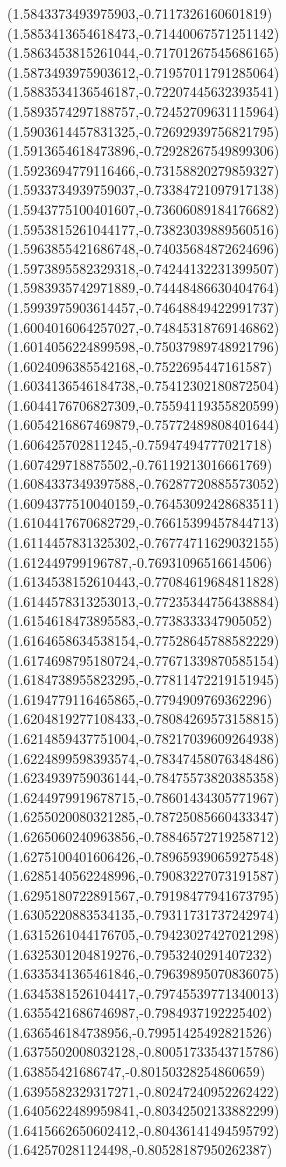 \documentclass[12pt]{article}
\theoremstyle{plain}
\theoremstyle{definition}
\theoremstyle{remark}
\begin{document}
\begin{figure}
{  (1.5843373493975903,-0.7117326160601819)%
  (1.5853413654618473,-0.71440067571251142)%
  (1.5863453815261044,-0.71701267545686165)%
  (1.5873493975903612,-0.71957011791285064)%
  (1.5883534136546187,-0.72207445632393541)%
  (1.5893574297188757,-0.72452709631115964)%
  (1.5903614457831325,-0.72692939756821795)%
  (1.5913654618473896,-0.72928267549899306)%
  (1.5923694779116466,-0.73158820279859327)%
  (1.5933734939759037,-0.73384721097917138)%
  (1.5943775100401607,-0.73606089184176682)%
  (1.5953815261044177,-0.73823039889560516)%
  (1.5963855421686748,-0.74035684872624696)%
  (1.5973895582329318,-0.74244132231399507)%
  (1.5983935742971889,-0.74448486630404764)%
  (1.5993975903614457,-0.74648849422991737)%
  (1.6004016064257027,-0.74845318769146862)%
  (1.6014056224899598,-0.75037989748921796)%
  (1.6024096385542168,-0.7522695447161587)%
  (1.6034136546184738,-0.75412302180872504)%
  (1.6044176706827309,-0.75594119355820599)%
  (1.6054216867469879,-0.75772489808401644)%
  (1.606425702811245,-0.75947494777021718)%
  (1.607429718875502,-0.76119213016661769)%
  (1.6084337349397588,-0.76287720885573052)%
  (1.6094377510040159,-0.76453092428683511)%
  (1.6104417670682729,-0.76615399457844713)%
  (1.6114457831325302,-0.76774711629032155)%
  (1.612449799196787,-0.76931096516614506)%
  (1.6134538152610443,-0.77084619684811828)%
  (1.6144578313253013,-0.77235344756438884)%
  (1.6154618473895583,-0.7738333347905052)%
  (1.6164658634538154,-0.77528645788582229)%
  (1.6174698795180724,-0.77671339870585154)%
  (1.6184738955823295,-0.77811472219151945)%
  (1.6194779116465865,-0.7794909769362296)%
  (1.6204819277108433,-0.78084269573158815)%
  (1.6214859437751004,-0.78217039609264938)%
  (1.6224899598393574,-0.78347458076348486)%
  (1.6234939759036144,-0.78475573820385358)%
  (1.6244979919678715,-0.78601434305771967)%
  (1.6255020080321285,-0.78725085660433347)%
  (1.6265060240963856,-0.78846572719258712)%
  (1.6275100401606426,-0.78965939065927548)%
  (1.6285140562248996,-0.79083227073191587)%
  (1.6295180722891567,-0.79198477941673795)%
  (1.6305220883534135,-0.79311731737242974)%
  (1.6315261044176705,-0.79423027427021298)%
  (1.6325301204819276,-0.7953240291407232)%
  (1.6335341365461846,-0.79639895070836075)%
  (1.6345381526104417,-0.79745539771340013)%
  (1.6355421686746987,-0.7984937192225402)%
  (1.636546184738956,-0.79951425492821526)%
  (1.6375502008032128,-0.80051733543715786)%
  (1.63855421686747,-0.80150328254860659)%
  (1.6395582329317271,-0.80247240952262422)%
  (1.6405622489959841,-0.80342502133882299)%
  (1.6415662650602412,-0.80436141494595792)%
  (1.642570281124498,-0.80528187950262387)%
}
\end{figure}
\end{document}
